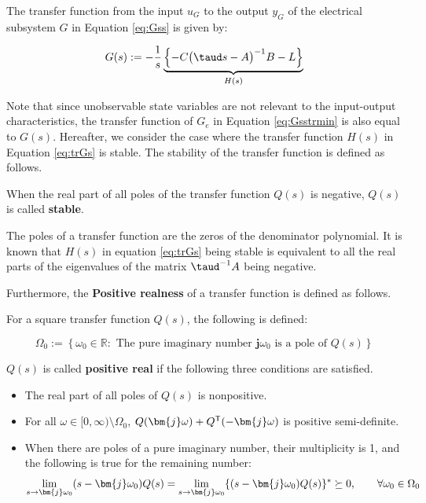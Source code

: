 \documentclass[graybox, envcountchap]{svmult}
\begin{document}
The transfer function from the input $u_G$ to the output $y_G$ of the electrical
subsystem $G$ in Equation \ref{eq:Gss} is given by:

\begin{equation}\label{eq:trGs}
  G(s) :=  - \frac{1}{s} 
  \underbrace{
  \left\{ -C \bigl( \taud s -A \bigr)^{-1} B - L \right\}
  }_{H(s)}
\end{equation}

Note that since unobservable state variables are not relevant to the
input-output characteristics, the transfer function of $G_e$ in Equation
\ref{eq:Gsstrmin} is also equal to $G(s)$. Hereafter, we consider the case where
the transfer function $H(s)$ in Equation \ref{eq:trGs} is stable. The stability
of the transfer function is defined as follows.

\begin{definition}\label{def:trsta}
When the real part of all poles of the transfer function $Q(s)$ is negative,
$Q(s)$ is called \textbf{stable}.
\end{definition}

The poles of a transfer function are the zeros of the denominator polynomial. It
is known that $H(s)$ in equation \ref{eq:trGs} being stable is equivalent to all
the real parts of the eigenvalues of the matrix $\taud^{-1}A$ being negative.

Furthermore, the \textbf{Positive realness} of a transfer function is defined as
follows.

\begin{definition}\label{def:trpf}
For a square transfer function $Q(s)$, the following is defined:

\begin{equation}\label{eq:defOm0}
  \Omega_0 := \left\{
  \omega_0 \in \mathbb{R}: 
  \mbox{ The pure imaginary number $\bm{j} \omega_0$ is a pole of $Q(s)$}
  \right\}
\end{equation}

$Q(s)$ is called \textbf{positive real} if the following three conditions are
satisfied.

\begin{itemize}
  \item The real part of all poles of $Q(s)$ is nonpositive.
  \item For all $\omega \in [0,\infty)\setminus \Omega_0$, $Q(\bm{j} \omega) + Q^{\sf T}(-\bm{j} \omega)$ is positive semi-definite.
  \item When there are poles of a pure imaginary number, their multiplicity is 1, and the following is true for the remaining number: 
  \begin{equation*}
    \lim_{s \rightarrow \bm{j} \omega_0} (s-\bm{j} \omega_0) Q(s) = \lim_{s\rightarrow \bm{j} \omega_0} \{ (s-\bm{j} \omega_0) Q(s)\}^{\sf *}\succeq 0
    ,\qquad
    \forall \omega_0 \in \Omega_0
  \end{equation*}
\end{itemize}
\end{definition}
\end{document}
